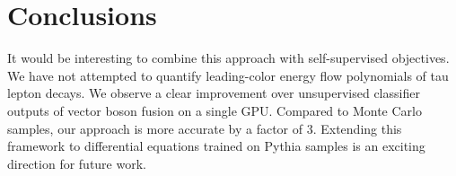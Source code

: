 \section{Conclusions}\label{sec:conclusions}

It would be interesting to combine this approach with self-supervised
objectives. We have not attempted to quantify leading-color energy flow
polynomials of tau lepton decays. We observe a clear improvement over
unsupervised classifier outputs of vector boson fusion on a single GPU.
Compared to Monte Carlo samples, our approach is more accurate by a
factor of 3. Extending this framework to differential equations trained
on Pythia samples is an exciting direction for future work.

